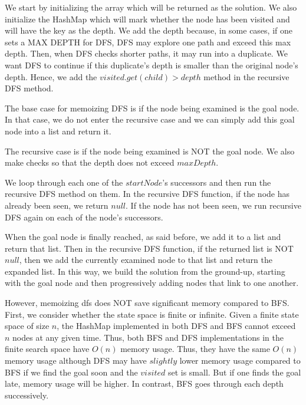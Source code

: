 \documentclass[a4paper]{report}
\begin{document}
We start by initializing the array which will be returned as the solution. We also initialize the HashMap which will
mark whether the node has been visited and will have the key as the depth. We add the depth because, in some cases, 
if one sets a MAX DEPTH for DFS, DFS may explore one path and exceed this max depth. Then, when DFS checks shorter
paths, it may run into a duplicate. We want DFS to continue if this duplicate's depth is smaller than the original node's
depth. Hence, we add the $visited.get(child) > depth$ method in the recursive DFS method.

The base case for memoizing DFS is if the node being examined is the goal node. In that case, we do not enter the recursive case and we can simply add this goal node into a list
and return it.

The recursive case is if the node being examined is NOT the goal node. We also make checks so that the depth does not 
exceed $maxDepth$. 

We loop through each one of the $startNode$'s successors and then run the recursive DFS method on them. In the
recursive DFS function, if the node has already been seen, we return $null$. If the node has not been seen,
we run recursive DFS again on each of the node's successors.

When the goal node is finally reached, as said before, we add it to a list and return that list. Then in the
recursive DFS function, if the returned list is NOT $null$, then we add the currently examined node to that list
and return the expanded list. In this way, we build the solution from the ground-up, starting with the
goal node and then progressively adding nodes that link to one another.

However, memoizing dfs does NOT save significant memory compared to BFS. First, we consider whether the state space is finite or infinite. 
Given a finite state space of size $n$, the HashMap implemented in both DFS and BFS cannot exceed $n$ nodes at any given time. Thus,
both BFS and DFS implementations in the finite search space have $O(n)$ memory usage. Thus, they have the same $O(n)$ memory usage
although DFS may have $slightly$ lower memory usage compared to BFS if we find the goal soon and the $visited$ set is small. 
But if one finds the goal late, memory usage will be higher. In contrast, BFS goes through each depth successively. 
\end{document}

